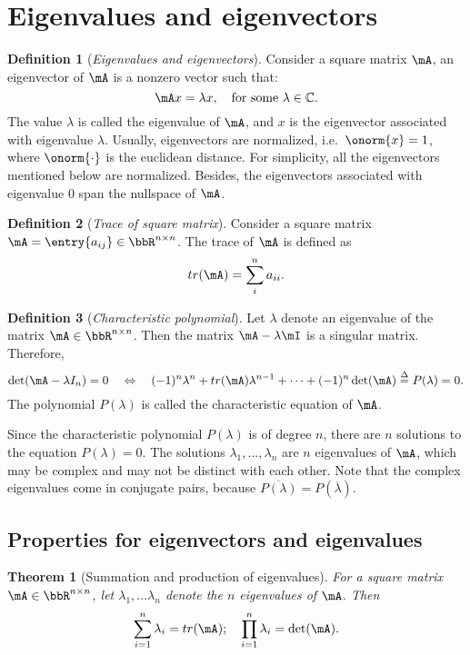 \documentclass[11pt]{article}
\theoremstyle{plain}
\newtheorem{thm}{Theorem}[section]
\theoremstyle{definition}
\newtheorem{defn}{Definition}
\begin{document}
\section{Eigenvalues and eigenvectors}
\begin{defn}[\textit{Eigenvalues and eigenvectors}]\label{def:eigen}
	Consider a square matrix $\mA$, an eigenvector of $\mA$ is a nonzero vector such that:
	\[ \mA x = \lambda x, \quad \text{for some } \lambda \in \mathbb{C}. \]
	The value $\lambda$ is called the eigenvalue of $\mA$, and $x$ is the eigenvector associated with eigenvalue $\lambda$. Usually, eigenvectors are normalized, i.e.\ $\onorm{x} = 1$, where $\onorm{\cdot}$ is the euclidean distance. For simplicity, all the eigenvectors mentioned below are normalized. Besides, the eigenvectors associated with eigenvalue 0 span the nullspace of $\mA$.
\end{defn}

\begin{defn}[\textit{Trace of square matrix}]\label{def:trace}
Consider a square matrix $\mA = \entry{a_{ij}} \in \bbR^{n \times n}$. The trace of $\mA$ is defined as
\[ tr(\mA) = \sum_{i}^n a_{ii}.\] 
\end{defn}

\begin{defn}[\textit{Characteristic polynomial}]\label{def:charac}
	Let $\lambda$ denote an eigenvalue of the matrix $\mA\in \bbR^{n \times n}$. Then the matrix $\mA - \lambda \mI$ is a singular matrix. Therefore,
	\[ \det(\mA - \lambda I_n) = 0 \quad  \Leftrightarrow \quad (-1)^n \lambda^n + tr(\mA)\lambda^{n-1} + \cdots + (-1)^n \det(\mA) \overset{\Delta}{=} P(\lambda) = 0.   \]
	 The polynomial $P(\lambda)$ is called the characteristic equation of $\mA$. 
\end{defn}

Since the characteristic polynomial $P(\lambda)$ is of degree $n$, there are $n$ solutions to the equation $P(\lambda) = 0$. The solutions $\lambda_1,...,\lambda_n$ are $n$ eigenvalues of $\mA$, which may be complex and may not be distinct with each other. Note that the complex eigenvalues come in conjugate pairs, because $\overline{ P(\lambda)} = P(\overline{ \lambda})$. 

\subsection{Properties for eigenvectors and eigenvalues}

\begin{thm}[Summation and production of eigenvalues]\label{thm:speigen}
	For a square matrix $\mA \in \bbR^{n \times n}$, let $\lambda_1,...\lambda_n$ denote the $n$ eigenvalues of $\mA$. Then 
	\begin{equation}
		\sum_{i=1}^n \lambda_i = tr(\mA); \quad \prod_{i=1}^n \lambda_i = \det(\mA).
	\end{equation} 
\end{thm}
\end{document}
